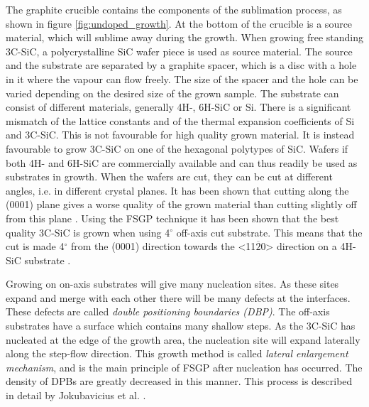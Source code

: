 The graphite crucible contains the components of the sublimation process, as shown in figure \ref{fig:undoped_growth}. At the bottom of the crucible is a source material, which will sublime away during the growth. When growing free standing 3C-SiC, a polycrystalline SiC wafer piece is used as source material. The source and the substrate are separated by a graphite spacer, which is a disc with a hole in it where the vapour can flow freely. The size of the spacer and the hole can be varied depending on the desired size of the grown sample. The substrate can consist of different materials, generally 4H-, 6H-SiC or Si. There is a significant mismatch of the lattice constants and of the thermal expansion coefficients of Si and 3C-SiC. This is not favourable for high quality grown material. It is instead favourable to grow 3C-SiC on one of the hexagonal polytypes of SiC. Wafers if both 4H- and 6H-SiC are commercially available and can thus readily be used as substrates in growth. When the wafers are cut, they can be cut at different angles, i.e. in different crystal planes. It has been shown that cutting along the (0001) plane gives a worse quality of the grown material than cutting slightly off from this plane \cite{Vasiliauskas2012}. Using the FSGP technique it has been shown that the best quality 3C-SiC is grown when using 4$^\circ$ off-axis cut substrate. This means that the cut is made 4$^\circ$ from the (0001) direction towards the <11$\overline{2}$0> direction on a 4H-SiC substrate \cite{Jokubavicius2014}.

Growing on on-axis substrates will give many nucleation sites. As these sites expand and merge with each other there will be many defects at the interfaces. These defects are called \emph{double positioning boundaries (DBP)}. The off-axis substrates have a surface which contains many shallow steps. As the 3C-SiC has nucleated at the edge of the growth area, the nucleation site will expand laterally along the step-flow direction. This growth method is called \emph{lateral enlargement mechanism}, and is the main principle of FSGP after nucleation has occurred. The density of DPBs are greatly decreased in this manner. This process is described in detail by Jokubavicius et al. \cite{Jokubavicius2014}.

